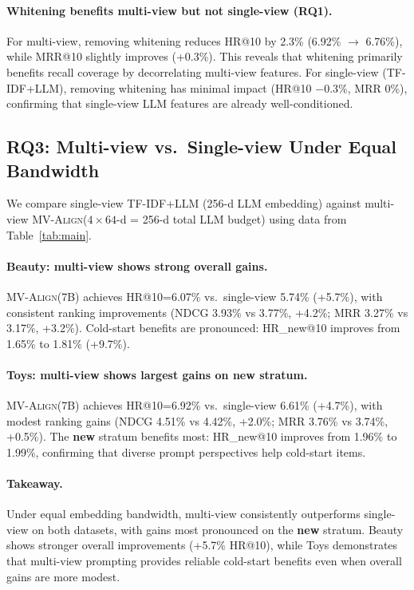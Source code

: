 \documentclass[sigconf,natbib=true]{acmart}
\newcommand{\model}{\textsc{MV-Align}\xspace}
\begin{document}
\paragraph{Whitening benefits multi-view but not single-view (RQ1).}
For multi-view, removing whitening reduces HR@10 by 2.3\% (6.92\% $\to$ 6.76\%),
while MRR@10 slightly improves (+0.3\%). This reveals that whitening primarily
benefits recall coverage by decorrelating multi-view features.
For single-view (TF-IDF+LLM), removing whitening has minimal impact
(HR@10 $-$0.3\%, MRR 0\%), confirming that single-view LLM features
are already well-conditioned.

\subsection{RQ3: Multi-view vs.\ Single-view Under Equal Bandwidth}

We compare single-view TF-IDF+LLM (256-d LLM embedding) against
multi-view \model ($4\times 64$-d = 256-d total LLM budget) using
data from Table~\ref{tab:main}.

\paragraph{Beauty: multi-view shows strong overall gains.}
\model (7B) achieves HR@10=6.07\% vs.\ single-view 5.74\% (+5.7\%),
with consistent ranking improvements (NDCG 3.93\% vs 3.77\%, +4.2\%;
MRR 3.27\% vs 3.17\%, +3.2\%). Cold-start benefits are pronounced:
HR\_new@10 improves from 1.65\% to 1.81\% (+9.7\%).

\paragraph{Toys: multi-view shows largest gains on new stratum.}
\model (7B) achieves HR@10=6.92\% vs.\ single-view 6.61\% (+4.7\%),
with modest ranking gains (NDCG 4.51\% vs 4.42\%, +2.0\%;
MRR 3.76\% vs 3.74\%, +0.5\%). The \textbf{new} stratum benefits
most: HR\_new@10 improves from 1.96\% to 1.99\%, confirming that
diverse prompt perspectives help cold-start items.

\paragraph{Takeaway.}
Under equal embedding bandwidth, multi-view consistently outperforms
single-view on both datasets, with gains most pronounced on the
\textbf{new} stratum. Beauty shows stronger overall improvements
(+5.7\% HR@10), while Toys demonstrates that multi-view prompting
provides reliable cold-start benefits even when overall gains are
more modest.
\end{document}
